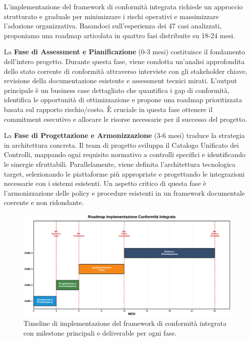 L'implementazione del framework di conformità integrata richiede un approccio strutturato e graduale per minimizzare i rischi operativi e massimizzare l'adozione organizzativa. Basandoci sull'esperienza dei 47 casi analizzati, proponiamo una roadmap articolata in quattro fasi distribuite su 18-24 mesi.

La \textbf{Fase di Assessment e Pianificazione} (0-3 mesi) costituisce il fondamento dell'intero progetto. Durante questa fase, viene condotta un'analisi approfondita dello stato corrente di conformità attraverso interviste con gli stakeholder chiave, revisione della documentazione esistente e assessment tecnici mirati. L'output principale è un business case dettagliato che quantifica i gap di conformità, identifica le opportunità di ottimizzazione e propone una roadmap prioritizzata basata sul rapporto rischio/costo. È cruciale in questa fase ottenere il commitment esecutivo e allocare le risorse necessarie per il successo del progetto.

La \textbf{Fase di Progettazione e Armonizzazione} (3-6 mesi) traduce la strategia in architettura concreta. Il team di progetto sviluppa il Catalogo Unificato dei Controlli, mappando ogni requisito normativo a controlli specifici e identificando le sinergie sfruttabili. Parallelamente, viene definita l'architettura tecnologica target, selezionando le piattaforme più appropriate e progettando le integrazioni necessarie con i sistemi esistenti. Un aspetto critico di questa fase è l'armonizzazione delle policy e procedure esistenti in un framework documentale coerente e non ridondante.

\begin{figure}[h]
\centering
\includegraphics[width=\textwidth]{thesis_figures/cap4/figura_4_6_timeline_LARGE.pdf}
\caption{Timeline di implementazione del framework di conformità integrata con milestone principali e deliverable per ogni fase.}
\label{fig:timeline}
\end{figure}


